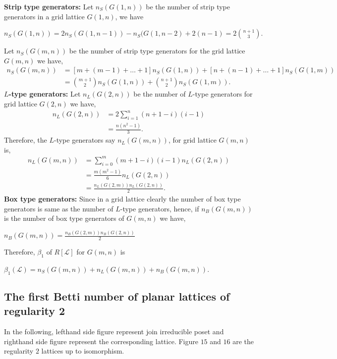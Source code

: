 \documentclass[10pt,reqno]{amsart}
\numberwithin{equation}{section}
\begin{document}
{\bf Strip type generators:} Let $n_S(G(1,n))$ be the number of strip type generators in a grid lattice $G(1,n)$, we have 
\begin{center}
	$n_S(G(1,n))=2n_S(G(1,n-1))- n_S(G(1,n-2) + 2(n-1)=2 \binom{n+1}{3}.$
\end{center}

\noindent Let $n_S(G(m,n))$ be the number of strip type generators for the grid lattice $G(m,n)$ we have,
\begin{align*}
	n_S(G(m,n))&=[m+(m-1)+ \ldots +1] n_S(G(1,n))+[n+(n-1)+ \ldots + 1] n_S(G(1,m))\\
	&=\binom{m+1}{2}n_S(G(1,n))+\binom{n+1}{2}n_S(G(1,m)).
\end{align*}
{\bf $L$-type generators:} Let $n_L(G(2,n))$ be the number of $L$-type generators for grid lattice $G(2,n)$ we have,
\begin{align*}
	n_L(G(2,n))&=2 \sum_{i=1}^{n}(n+1-i)(i-1)\\
	&=\frac{n(n^2-1)}{3}.
\end{align*}
Therefore, the $L$-type generators say $n_L(G(m,n))$, for grid lattice $G(m,n)$ is,
\begin{align*}
	n_L(G(m,n))& = \sum_{i=0}^{m}(m+1-i)(i-1)n_L(G(2,n))\\
	&=\frac{m(m^2-1)}{6}n_L(G(2,n))\\
	&= \frac{n_L(G(2,m))n_L(G(2,n))}{2}.
\end{align*}
{\bf Box type generators:} Since in a grid lattice clearly the number of box type generators is same as the number of $L$-type generators, hence, if $n_B(G(m,n))$ is the number of box type generators of $G(m,n)$ we have,
\begin{center}
	$n_B(G(m,n))=\frac{n_B(G(2,m))n_B(G(2,n))}{2}$
\end{center}
Therefore, $\beta_1$ of $R[\mathcal{L}]$ for $G(m,n)$ is 
\begin{center}
	$\beta_1(\mathcal{L})= n_S(G(m,n))+ n_L(G(m,n))+ n_B(G(m,n))$.
	\end{center}
\subsection{The first Betti number of planar lattices of regularity 2} In the following, lefthand side figure represent join irreducible poset and righthand side figure represent the corresponding lattice. Figure $15$ and $16$ are the regularity $2$ lattices up to isomorphism.


\end{document}
